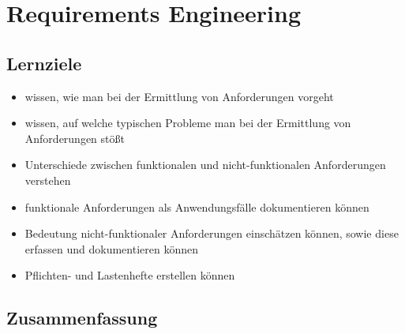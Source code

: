 \section*{Requirements Engineering}

\subsection*{Lernziele}
\begin{itemize}
    \item wissen, wie man bei der Ermittlung von Anforderungen vorgeht
    \item wissen, auf welche typischen Probleme man bei der Ermittlung von Anforderungen stößt
    \item Unterschiede zwischen funktionalen und nicht-funktionalen Anforderungen verstehen
    \item funktionale Anforderungen als Anwendungsfälle dokumentieren können
    \item Bedeutung nicht-funktionaler Anforderungen einschätzen können, sowie diese erfassen und dokumentieren können
    \item Pflichten- und Lastenhefte erstellen können
\end{itemize}

\subsection*{Zusammenfassung}

